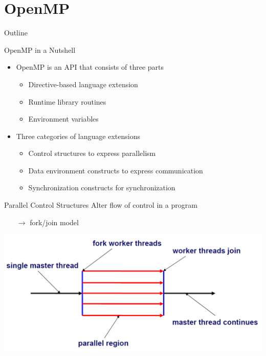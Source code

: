 \section{OpenMP}

\begin{frame}{Outline}
  \tableofcontents[current]
\end{frame}

\begin{frame}{OpenMP in a Nutshell}
  \begin{itemize}
  \item OpenMP is an API that consists of three parts
    \begin{itemize}
    \item Directive-based language extension
    \item Runtime library routines
    \item Environment variables
    \end{itemize}
  \item Three categories of language extensions
    \begin{itemize}
    \item Control structures to express \alert{parallelism}
    \item Data environment constructs to express \alert{communication}
    \item Synchronization constructs for \alert{synchronization}
    \end{itemize}
  \end{itemize}
\end{frame}

\begin{frame}{Parallel Control Structures}
  Alter flow of control in a program

  \begin{itemize}
  \item[$\rightarrow$] fork/join model
  \end{itemize}


  \begin{center}
    \includegraphics[width=\textwidth]{figures/openmp}
  \end{center}
\end{frame}

